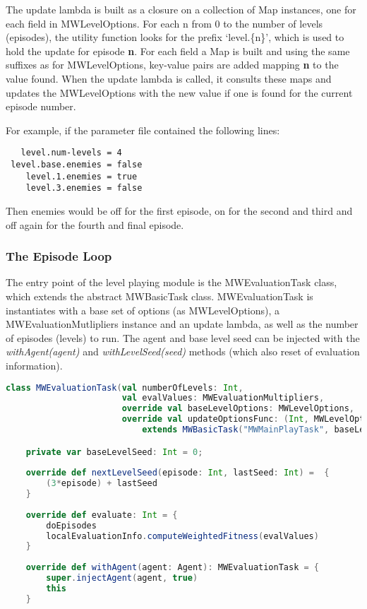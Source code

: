 The update lambda is built as a closure on a collection of Map instances, one for each field in MWLevelOptions. For each {\ttfamily n} from 0 to the number of levels (episodes), the utility function looks for the prefix `{\ttfamily level.\{n\}}', which is used to hold the update for episode \textbf{n}. For each field a Map is built and using the same suffixes as for MWLevelOptions, key-value pairs are added mapping \textbf{n} to the value found. When the update lambda is called, it consults these maps and updates the MWLevelOptions with the new value if one is found for the current episode number.

For example, if the parameter file contained the following lines:

\begin{minipage}{0.9\linewidth}
\centering
\begin{lstlisting}
   level.num-levels = 4
 level.base.enemies = false
    level.1.enemies = true
    level.3.enemies = false
\end{lstlisting}
\end{minipage}

Then enemies would be off for the first episode, on for the second and third and off again for the fourth and final episode.

\subsubsection{The Episode Loop}

The entry point of the level playing module is the MWEvaluationTask class, which extends the abstract MWBasicTask class. MWEvaluationTask is instantiates with a base set of options (as MWLevelOptions), a MWEvaluationMutlipliers instance and an update lambda, as well as the number of episodes (levels) to run. The agent and base level seed can be injected with the \emph{withAgent(agent)} and \emph{withLevelSeed(seed)} methods (which also reset of evaluation information).

\begin{minipage}{0.9\linewidth}
\centering
\begin{lstlisting}[language=scala]
class MWEvaluationTask(val numberOfLevels: Int, 
                       val evalValues: MWEvaluationMultipliers, 
                       override val baseLevelOptions: MWLevelOptions, 
                       override val updateOptionsFunc: (Int, MWLevelOptions) => MWLevelOptions)
                           extends MWBasicTask("MWMainPlayTask", baseLevelOptions, updateOptionsFunc, visualisation, args) with EvaluationTask {

    private var baseLevelSeed: Int = 0;
    
    override def nextLevelSeed(episode: Int, lastSeed: Int) =  {
        (3*episode) + lastSeed
    }    
        
    override def evaluate: Int = {
        doEpisodes
        localEvaluationInfo.computeWeightedFitness(evalValues)
    }
  
    override def withAgent(agent: Agent): MWEvaluationTask = {
        super.injectAgent(agent, true)
        this
    }
\end{lstlisting}
\end{minipage}     
    
